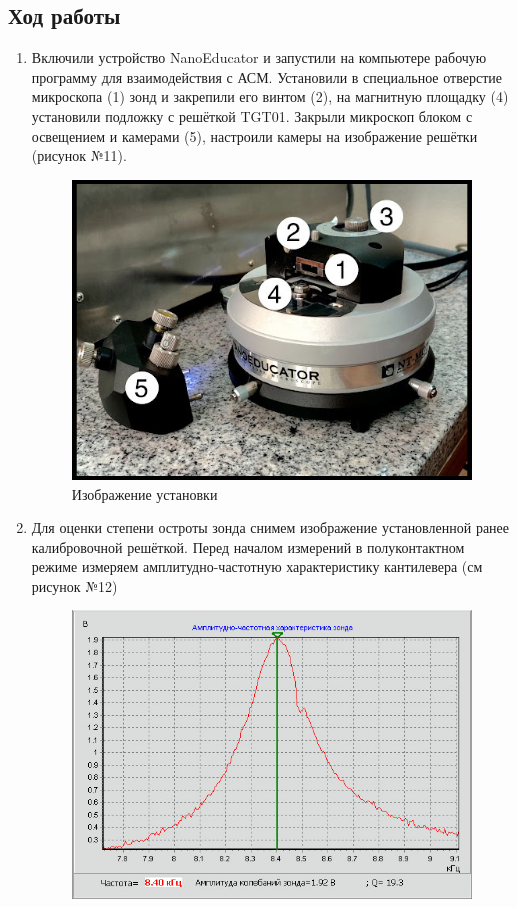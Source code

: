 \documentclass[a4paper,12pt]{article}
\theoremstyle{plain} %
\theoremstyle{definition} %
\theoremstyle{remark} %
\begin{document}
\begin{itemize}
\section{Ход работы}
\begin{enumerate}
	\item
	 Включили устройство NanoEducator и запустили на компьютере рабочую программу для взаимодействия с АСМ. Установили в специальное отверстие микроскопа (1) зонд и закрепили его винтом (2), на магнитную площадку (4) установили подложку с решёткой TGT01. Закрыли микроскоп блоком с освещением и камерами (5), настроили камеры на изображение решётки (рисунок №11).
	 \begin{figure}[H]
	 	\centering
	 	\includegraphics[scale=0.9]{pic12.jpg}
	 	\caption{Изображение установки}
	 	\label{pic12}
	 \end{figure}
	\item
	Для оценки степени остроты зонда снимем изображение установленной ранее калибровочной решёткой. Перед началом измерений в полуконтактном режиме измеряем амплитудно-частотную характеристику кантилевера (см рисунок №12)
	\begin{figure}[H]
		\centering
		\includegraphics[scale=2]{pic13.jpg}

\end{figure}
\end{enumerate}
\end{itemize}
\end{document}
